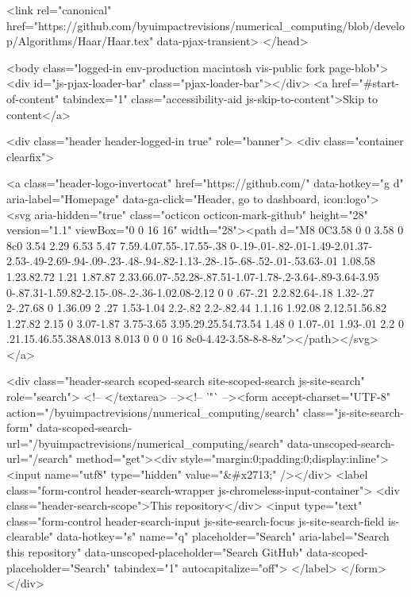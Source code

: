      <link rel="canonical" href="https://github.com/byuimpactrevisions/numerical_computing/blob/develop/Algorithms/Haar/Haar.tex" data-pjax-transient>
  </head>


  <body class="logged-in   env-production macintosh vis-public fork page-blob">
    <div id="js-pjax-loader-bar" class="pjax-loader-bar"></div>
    <a href="#start-of-content" tabindex="1" class="accessibility-aid js-skip-to-content">Skip to content</a>

    
    
    



        <div class="header header-logged-in true" role="banner">
  <div class="container clearfix">

    <a class="header-logo-invertocat" href="https://github.com/" data-hotkey="g d" aria-label="Homepage" data-ga-click="Header, go to dashboard, icon:logo">
  <svg aria-hidden="true" class="octicon octicon-mark-github" height="28" version="1.1" viewBox="0 0 16 16" width="28"><path d="M8 0C3.58 0 0 3.58 0 8c0 3.54 2.29 6.53 5.47 7.59.4.07.55-.17.55-.38 0-.19-.01-.82-.01-1.49-2.01.37-2.53-.49-2.69-.94-.09-.23-.48-.94-.82-1.13-.28-.15-.68-.52-.01-.53.63-.01 1.08.58 1.23.82.72 1.21 1.87.87 2.33.66.07-.52.28-.87.51-1.07-1.78-.2-3.64-.89-3.64-3.95 0-.87.31-1.59.82-2.15-.08-.2-.36-1.02.08-2.12 0 0 .67-.21 2.2.82.64-.18 1.32-.27 2-.27.68 0 1.36.09 2 .27 1.53-1.04 2.2-.82 2.2-.82.44 1.1.16 1.92.08 2.12.51.56.82 1.27.82 2.15 0 3.07-1.87 3.75-3.65 3.95.29.25.54.73.54 1.48 0 1.07-.01 1.93-.01 2.2 0 .21.15.46.55.38A8.013 8.013 0 0 0 16 8c0-4.42-3.58-8-8-8z"></path></svg>
</a>


        <div class="header-search scoped-search site-scoped-search js-site-search" role="search">
  <!-- </textarea> --><!-- '"` --><form accept-charset="UTF-8" action="/byuimpactrevisions/numerical_computing/search" class="js-site-search-form" data-scoped-search-url="/byuimpactrevisions/numerical_computing/search" data-unscoped-search-url="/search" method="get"><div style="margin:0;padding:0;display:inline"><input name="utf8" type="hidden" value="&#x2713;" /></div>
    <label class="form-control header-search-wrapper js-chromeless-input-container">
      <div class="header-search-scope">This repository</div>
      <input type="text"
        class="form-control header-search-input js-site-search-focus js-site-search-field is-clearable"
        data-hotkey="s"
        name="q"
        placeholder="Search"
        aria-label="Search this repository"
        data-unscoped-placeholder="Search GitHub"
        data-scoped-placeholder="Search"
        tabindex="1"
        autocapitalize="off">
    </label>
</form></div>


